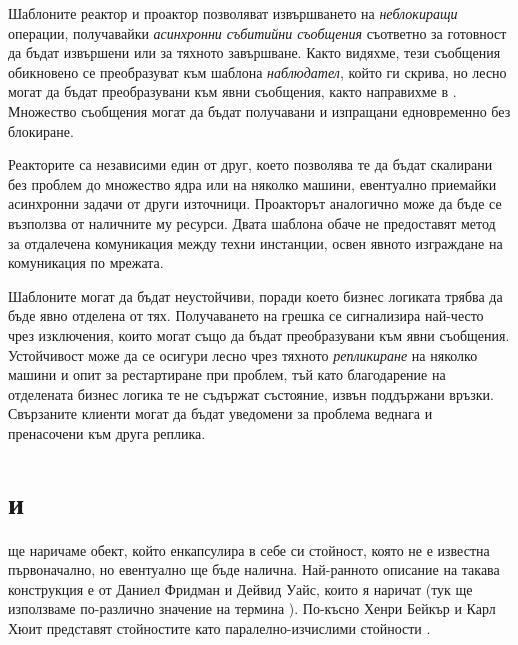 Шаблоните реактор и проактор позволяват извършването на \emph{неблокиращи} операции, получавайки \emph{асинхронни събитийни съобщения} съответно за готовност да бъдат извършени или за тяхното завършване. Както видяхме, тези съобщения обикновено се преобразуват към шаблона \emph{наблюдател}, който ги скрива, но лесно могат да бъдат преобразувани към явни съобщения, както направихме в . Множество съобщения могат да бъдат получавани и изпращани едновременно без блокиране.

Реакторите са независими един от друг, което позволява те да бъдат скалирани без проблем до множество ядра или на няколко машини, евентуално приемайки асинхронни задачи от други източници. Проакторът аналогично може да бъде се възползва от наличните му ресурси. Двата шаблона обаче не предоставят метод за отдалечена комуникация между техни инстанции, освен явното изграждане на комуникация по мрежата.

Шаблоните могат да бъдат неустойчиви, поради което бизнес логиката трябва да бъде явно отделена от тях. Получаването на грешка се сигнализира най-често чрез изключения, които могат също да бъдат преобразувани към явни съобщения. Устойчивост може да се осигури лесно чрез тяхното \emph{репликиране} на няколко машини и опит за рестартиране при проблем, тъй като благодарение на отделената бизнес логика те не съдържат състояние, извън поддържани връзки. Свързаните клиенти могат да бъдат уведомени за проблема веднага и пренасочени към друга реплика.

\section{ и }

 ще наричаме обект, който енкапсулира в себе си стойност, която не е известна първоначално, но евентуално ще бъде налична. Най-ранното описание на такава конструкция е от Даниел Фридман и Дейвид Уайс, които я наричат  \cite{friedman1976Promises} (тук ще използваме по-различно значение на термина ). По-късно Хенри Бейкър и Карл Хюит представят  стойностите като паралелно-изчислими стойности \cite{baker1977Futures}.

